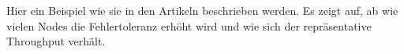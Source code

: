 \begin{flushleft}
    Hier ein Beispiel wie sie in den Artikeln \cite{UMIGLCCI, YDS7DTYM, V4XLXN7W} beschrieben werden.
    Es zeigt auf, ab wie vielen Nodes die Fehlertoleranz erhöht wird und wie sich der repräsentative Throughput verhält.
    \begin{table}[H]
    \caption{Quorum Beispiele}
    \label{tab:quorum-beispiele}
    \end{table}
\end{flushleft}